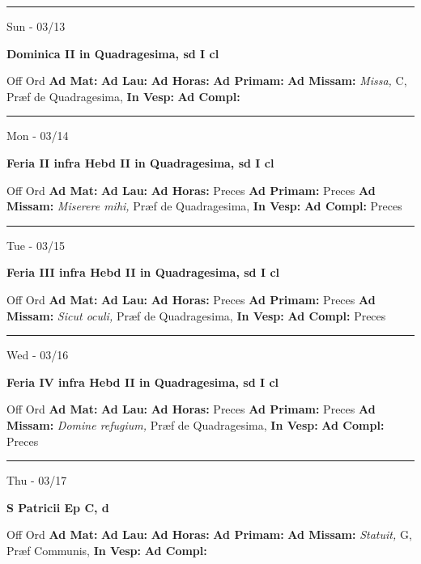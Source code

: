 \documentclass[letterpaper, 10pt]{article}
\begin{document}
\hrule
\begin{center}
Sun - 03/13
\end{center}\textbf{ \large Dominica II in Quadragesima, \textnormal{\normalsize sd I cl}}
\begin{justify}
Off Ord
\textbf{Ad Mat: }
\textbf{Ad Lau: }
\textbf{Ad Horas: }
\textbf{Ad Primam: }
\textbf{Ad Missam:} \textit{Missa, } C, Præf de Quadragesima, 
\textbf{In Vesp: }
\textbf{Ad Compl: }\end{justify}



\hrule
\begin{center}
Mon - 03/14
\end{center}\textbf{ \large Feria II infra Hebd II in Quadragesima, \textnormal{\normalsize sd I cl}}
\begin{justify}
Off Ord
\textbf{Ad Mat: }
\textbf{Ad Lau: }
\textbf{Ad Horas: }Preces
\textbf{Ad Primam: }Preces
\textbf{Ad Missam:} \textit{Miserere mihi, } Præf de Quadragesima, 
\textbf{In Vesp: }
\textbf{Ad Compl: }Preces\end{justify}



\hrule
\begin{center}
Tue - 03/15
\end{center}\textbf{ \large Feria III infra Hebd II in Quadragesima, \textnormal{\normalsize sd I cl}}
\begin{justify}
Off Ord
\textbf{Ad Mat: }
\textbf{Ad Lau: }
\textbf{Ad Horas: }Preces
\textbf{Ad Primam: }Preces
\textbf{Ad Missam:} \textit{Sicut oculi, } Præf de Quadragesima, 
\textbf{In Vesp: }
\textbf{Ad Compl: }Preces\end{justify}



\hrule
\begin{center}
Wed - 03/16
\end{center}\textbf{ \large Feria IV infra Hebd II in Quadragesima, \textnormal{\normalsize sd I cl}}
\begin{justify}
Off Ord
\textbf{Ad Mat: }
\textbf{Ad Lau: }
\textbf{Ad Horas: }Preces
\textbf{Ad Primam: }Preces
\textbf{Ad Missam:} \textit{Domine refugium, } Præf de Quadragesima, 
\textbf{In Vesp: }
\textbf{Ad Compl: }Preces\end{justify}



\hrule
\begin{center}
Thu - 03/17
\end{center}\textbf{ \large S Patricii Ep C, \textnormal{\normalsize d}}
\begin{justify}
Off Ord
\textbf{Ad Mat: }
\textbf{Ad Lau: }
\textbf{Ad Horas: }
\textbf{Ad Primam: }
\textbf{Ad Missam:} \textit{Statuit, } G, Præf Communis, 
\textbf{In Vesp: }
\textbf{Ad Compl: }\end{justify}
\end{document}
